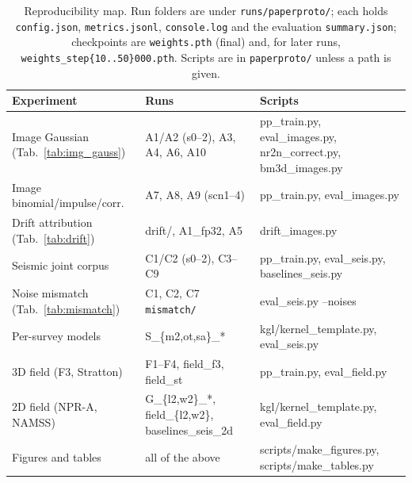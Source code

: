 \begin{table}[!t]
\centering
\caption{Reproducibility map. Run folders are under \texttt{runs/paperproto/}; each holds \texttt{config.json}, \texttt{metrics.jsonl}, \texttt{console.log} and the evaluation \texttt{summary.json}; checkpoints are \texttt{weights.pth} (final) and, for later runs, \texttt{weights\_step\{10..50\}000.pth}. Scripts are in \texttt{paperproto/} unless a path is given.}
\label{tab:repro}
\scriptsize
\begin{tabular}{@{}p{}p{}p{}@{}}
\toprule
Experiment & Runs & Scripts \\
\midrule
Image Gaussian (Tab.~\ref{tab:img_gauss}) & A1/A2 (s0--2), A3, A4, A6, A10 & pp\_train.py, eval\_images.py, nr2n\_correct.py, bm3d\_images.py \\
Image binomial/impulse/corr. & A7, A8, A9 (scn1--4) & pp\_train.py, eval\_images.py \\
Drift attribution (Tab.~\ref{tab:drift}) & drift/, A1\_fp32, A5 & drift\_images.py \\
Seismic joint corpus & C1/C2 (s0--2), C3--C9 & pp\_train.py, eval\_seis.py, baselines\_seis.py \\
Noise mismatch (Tab.~\ref{tab:mismatch}) & C1, C2, C7 \texttt{mismatch/} & eval\_seis.py --noises \\
Per-survey models & S\_\{m2,ot,sa\}\_* & kgl/kernel\_template.py, eval\_seis.py \\
3D field (F3, Stratton) & F1--F4, field\_f3, field\_st & pp\_train.py, eval\_field.py \\
2D field (NPR-A, NAMSS) & G\_\{l2,w2\}\_*, field\_\{l2,w2\}, baselines\_seis\_2d & kgl/kernel\_template.py, eval\_field.py \\
Figures and tables & all of the above & scripts/make\_figures.py, scripts/make\_tables.py \\
\bottomrule
\end{tabular}
\end{table}
